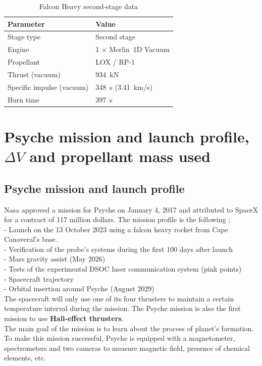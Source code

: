 \documentclass[11pt,a4paper]{article}
\begin{document}
\begin{table}[H]
    \centering
    \caption{Falcon Heavy second-stage data}
    \begin{tabular}{l l}
        \hline
        Parameter          & Value \\
        \hline
        Stage type         & Second stage \\
        Engine             & 1 $\times$ Merlin~1D Vacuum \\
        Propellant         & LOX / RP-1 \\
        Thrust (vacuum)    & \SI{934}{kN} \\
        Specific impulse (vacuum) & \SI{348}{s} \; (\SI{3.41}{km/s}) \\
        Burn time          & \SI{397}{s} \\
        \hline
    \end{tabular}
\end{table}

\FloatBarrier

\newpage
\section{Psyche mission and launch profile, $\Delta V$ and propellant mass used}

\subsection{Psyche mission and launch profile}
Nasa approved a mission for Psyche on January 4, 2017 and attributed to SpaceX for a contract of 117 million dollars. The mission profile is the following ; \\
- Launch on the 13 October 2023 using a falcon heavy rocket from Cape Canaveral's base. \\
- Verification of the probe's systems during the first 100 days after launch \\
- Mars gravity assist (May 2026) \\
- Tests of the experimental DSOC laser communication system (pink points)\\
- Spacecraft trajectory \\
- Orbital insertion around Psyche (August 2029)\\

The spacecraft will only use one of its four thrusters to maintain a certain temperature interval during the mission. The Psyche mission is also the first mission to use \textbf{Hall-effect thrusters}. \\
The main goal of the mission is to learn about the process of planet's formation. To make this mission successful, Psyche is equipped with a magnetometer, spectrometers and two cameras to measure magnetic field, presence of chemical elements, etc.
\end{document}
